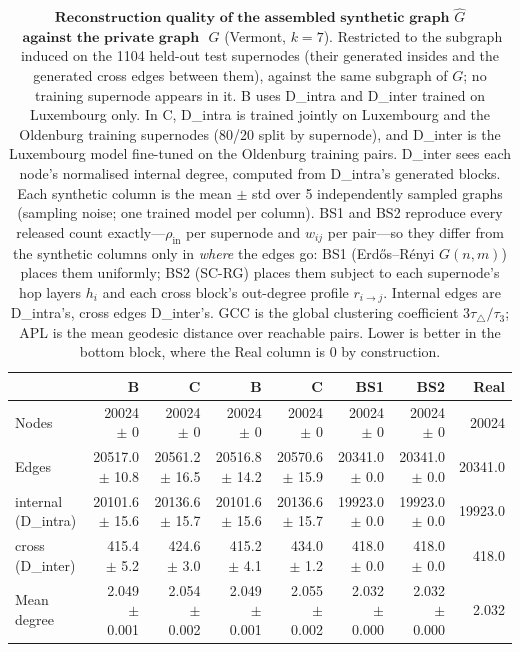 \begin{table}[H]
\centering
\caption{$\textbf{Reconstruction quality of the assembled synthetic graph}$
$\widehat{G}$ $\textbf{ against the private graph }$ $G$ (Vermont, $k{=}7$). Restricted to the subgraph induced on the 1104 held-out test supernodes (their generated insides and the generated cross edges between them), against the same subgraph of $G$; no training supernode appears in it.
B uses D\_intra and D\_inter trained on Luxembourg only. In C, D\_intra is trained jointly on Luxembourg and the Oldenburg training supernodes (80/20 split by supernode), and D\_inter is the Luxembourg model fine-tuned on the Oldenburg training pairs. D\_inter sees each node's normalised internal degree, computed from D\_intra's generated blocks. Each synthetic column is the
mean $\pm$ std over 5 independently sampled graphs (sampling noise; one trained
model per column). BS1 and BS2 reproduce every released count exactly---$\rho_{\mathrm{in}}$
per supernode and $w_{ij}$ per pair---so they differ from the synthetic columns
only in \emph{where} the edges go: BS1 (Erd\H{o}s--R\'enyi $G(n,m)$) places them
uniformly; BS2 (SC-RG) places them subject to each supernode's hop layers $h_i$ and
each cross block's out-degree profile $r_{i\to j}$. Internal edges are D\_intra's, cross edges
D\_inter's. GCC is the global clustering coefficient $3\tau_{\triangle}/\tau_{3}$;
APL is the mean geodesic distance over reachable pairs. Lower is better in the
bottom block, where the Real column is $0$ by construction.}
\label{tab:lsyn-vermont-k7-test}
\begin{tabular}{lrrrrrrr}
\toprule
 & B & C & B & C & BS1 & BS2 & Real \\
\midrule
Nodes                         & 20024 $\pm$ 0 & 20024 $\pm$ 0 & 20024 $\pm$ 0 & 20024 $\pm$ 0 & 20024 $\pm$ 0 & 20024 $\pm$ 0 & 20024 \\
Edges                         & 20517.0 $\pm$ 10.8 & 20561.2 $\pm$ 16.5 & 20516.8 $\pm$ 14.2 & 20570.6 $\pm$ 15.9 & 20341.0 $\pm$ 0.0 & 20341.0 $\pm$ 0.0 & 20341.0 \\
\quad internal (D\_intra)     & 20101.6 $\pm$ 15.6 & 20136.6 $\pm$ 15.7 & 20101.6 $\pm$ 15.6 & 20136.6 $\pm$ 15.7 & 19923.0 $\pm$ 0.0 & 19923.0 $\pm$ 0.0 & 19923.0 \\
\quad cross (D\_inter)        & 415.4 $\pm$ 5.2 & 424.6 $\pm$ 3.0 & 415.2 $\pm$ 4.1 & 434.0 $\pm$ 1.2 & 418.0 $\pm$ 0.0 & 418.0 $\pm$ 0.0 & 418.0 \\
Mean degree                   & 2.049 $\pm$ 0.001 & 2.054 $\pm$ 0.002 & 2.049 $\pm$ 0.001 & 2.055 $\pm$ 0.002 & 2.032 $\pm$ 0.000 & 2.032 $\pm$ 0.000 & 2.032 \\

\end{tabular}
\end{table}
